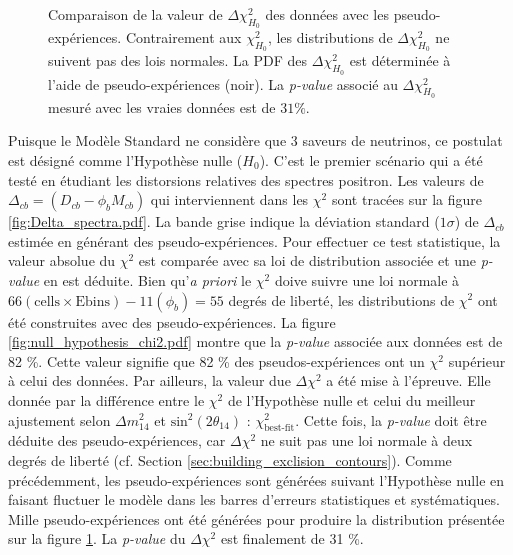 {\begin{figure}[h!]
\begin{minipage}[c]{.49\linewidth}
      \caption[Comparaison de la valeur de $\Delta\chi^2_{H_0}$ des données avec les pseudo-expériences]{Comparaison de la valeur de $\Delta\chi^2_{H_0}$ des données avec les pseudo-expériences. Contrairement aux $\chi^2_{H_0}$, les distributions de $\Delta\chi^2_{H_0}$ ne suivent pas des lois normales. La PDF des $\Delta\chi^2_{H_0}$ est déterminée à l'aide de pseudo-expériences (noir). La \textit{p-value} associé au $\Delta\chi^2_{H_0}$ mesuré avec les vraies données est de $31 \%$.}
    \label{fig:null_hypothesis_delta_chi2.pdf}
   \end{minipage}
\end{figure}

\clearpage

}

Puisque le Modèle Standard ne considère que 3 saveurs de neutrinos, ce postulat est désigné comme l'Hypothèse nulle ($H_0$). C'est le premier scénario qui a été testé en étudiant les distorsions relatives des spectres positron.  Les valeurs de $\Delta_{cb} = (D_{cb} - \phi_b M_{cb})$ qui interviennent dans les $\chi^2$ sont tracées sur la figure \ref{fig:Delta_spectra.pdf}. La bande grise indique la déviation standard ($1\sigma$) de $\Delta_{cb}$ estimée en générant des pseudo-expériences. Pour effectuer ce test statistique, la valeur absolue du $\chi^2$ est comparée avec sa loi de distribution associée et une \textit{p-value} en est déduite. Bien qu'\textit{a priori} le $\chi^2$ doive suivre une loi normale à $66(\textrm{cells}\times\textrm{Ebins}) - 11(\phi_b) = 55$ degrés de liberté, les distributions de $\chi^2$ ont été construites avec des pseudo-expériences. La figure \ref{fig:null_hypothesis_chi2.pdf} montre que la \textit{p-value} associée aux données est de  82 \%. Cette valeur signifie que 82 \% des pseudos-expériences ont un $\chi^2$ supérieur à celui des données. Par ailleurs, la valeur due $\Delta\chi^2$ a été mise à l'épreuve. Elle donnée par la différence entre le $\chi^2$ de l'Hypothèse nulle et celui du meilleur ajustement selon  $\Delta m_{14}^2$ et $\textrm{sin}^2\left(2\theta_{14}\right)$ : $\chi^2_\textrm{best-fit}$. Cette fois, la \textit{p-value} doit être déduite des pseudo-expériences, car $\Delta\chi^2$ ne suit pas une loi normale à deux degrés de liberté (cf. Section \ref{sec:building_exclision_contours}). Comme précédemment, les pseudo-expériences sont générées suivant l'Hypothèse nulle en faisant fluctuer le modèle dans les barres d'erreurs statistiques et systématiques. Mille pseudo-expériences ont été générées pour produire la distribution présentée sur la figure \ref{fig:null_hypothesis_delta_chi2.pdf}. La \textit{p-value} du $\Delta\chi^2$ est finalement de 31 \%.\\

